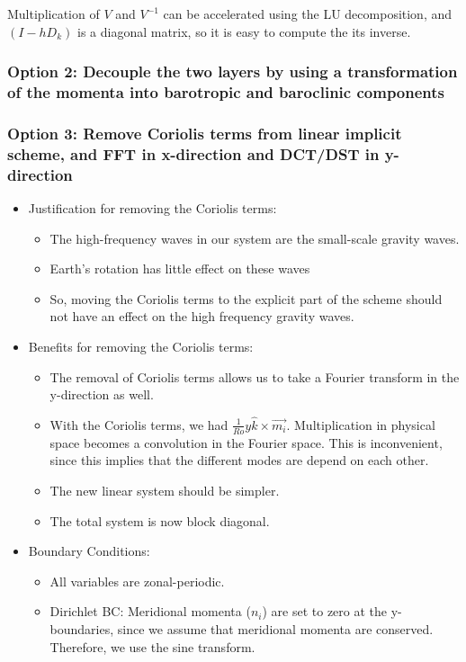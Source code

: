 \documentclass[10pt]{article}
\begin{document}
Multiplication of $V$ and $V^{-1}$ can be accelerated using the LU decomposition, and $(I-h D_k)$ is a diagonal matrix, so it is easy to compute the its inverse.

\subsubsection{Option 2: Decouple the two layers by using a transformation of the momenta into barotropic and baroclinic components}

\subsubsection{Option 3: Remove Coriolis terms from linear implicit scheme, and FFT in x-direction and DCT/DST in y-direction}
\begin{itemize}
	\item Justification for removing the Coriolis terms:
	\begin{itemize}
		\item The high-frequency waves in our system are the small-scale gravity waves.
		\item Earth's rotation has little effect on these waves
		\item So, moving the Coriolis terms to the explicit part of the scheme should not have an effect on the high frequency gravity waves.
	\end{itemize}
	\item Benefits for removing the Coriolis terms:
	\begin{itemize}
		\item The removal of Coriolis terms allows us to take a Fourier transform in the y-direction as well.
		\item With the Coriolis terms, we had $\frac{1}{Ro}y\hat{k}\times \vec{m_i}$. Multiplication in physical space becomes a convolution in the Fourier space. This is inconvenient, since this implies that the different modes are depend on each other. 
		\item The new linear system should be simpler.
		\item The total system is now block diagonal. 
	\end{itemize}
	\item Boundary Conditions:
	\begin{itemize}
		\item All variables are zonal-periodic. 
		\item Dirichlet BC: Meridional momenta ($n_i$) are set to zero at the y-boundaries, since we assume that meridional momenta are conserved. Therefore, we use the sine transform. 

\end{itemize}
\end{itemize}
\end{document}
